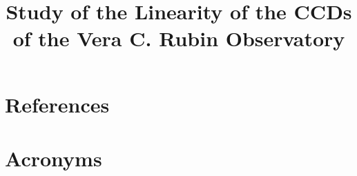 \documentclass[OPS,authoryear,toc]{lsstdoc}
\title{Study of the Linearity of the CCDs of the Vera C. Rubin Observatory}
\date{\vcsDate}
\begin{document}
\maketitle





\appendix
\section{References} \label{sec:bib}
\renewcommand{\refname}{} %


\section{Acronyms} \label{sec:acronyms}

\end{document}
